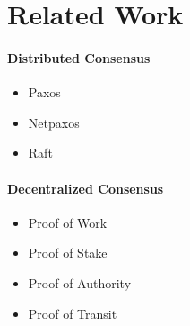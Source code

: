 \section{Related Work}

\begin{frame}
    \paragraph{Distributed Consensus}
    \begin{itemize}
        \item Paxos
        \item Netpaxos
        \item Raft
    \end{itemize}

    \paragraph{Decentralized Consensus}
    \begin{itemize}
        \item Proof of Work
        \item Proof of Stake
        \item Proof of Authority
        \item Proof of Transit
    \end{itemize}
\end{frame}